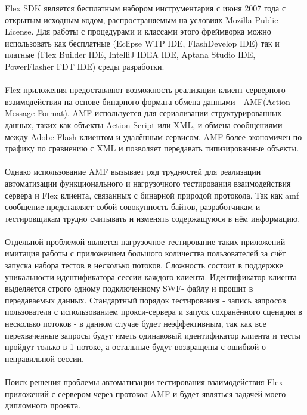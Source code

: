 Flex SDK  является бесплатным набором инструментария с июня 2007 
года с открытым исходным кодом,  распространяемым на условиях Mozilla Public License.  Для работы с процедурами и классами этого фреймворка можно использовать как бесплатные (Eclipse WTP IDE, FlashDevelop IDE) так и платные (Flex Builder IDE, IntelliJ IDEA IDE, Aptana Studio IDE, PowerFlasher FDT IDE) среды разработки.

\paragraph{ }

Flex приложения предоставляют возможность реализации клиент-серверного взаимодействия на основе бинарного формата обмена данными - AMF(Action Message Format). AMF используется для сериализации структурированных данных, таких как объекты Action Script или XML, и обмена сообщениями между Adobe Flash клиентом и удалённым сервисом. AMF более экономичен по трафику по сравнению с XML и позволяет передавать типизированные объекты.

\paragraph{ }

Однако использование AMF вызывает ряд трудностей для реализации автоматизации функционального и нагрузочного тестирования взаимодействия сервера и Flex клиента, связанных с бинарной природой протокола. Так как amf сообщение представляет собой совокупность байтов, разработчикам и тестировщикам трудно считывать и изменять содержащуюся в нём информацию.

\paragraph{ }

Отдельной проблемой является нагрузочное тестирование таких приложений - имитация работы с приложением большого количества пользователей за счёт запуска набора тестов в несколько потоков. Сложность состоит в поддержке уникальности идентификатора сессии каждого клиента. Идентификатор клиента выделяется строго одному подключенному SWF- файлу и прошит в передаваемых данных. Стандартный порядок тестирования - запись запросов пользователя с использованием прокси-сервера и запуск сохранённого сценария в несколько потоков - в данном случае будет неэффективным, так как  все перехваченные запросы будут иметь одинаковый идентификатор клиента и тесты пройдут только в 1 потоке, а остальные будут возвращены с ошибкой о неправильной сессии.
 
\paragraph{ }

Поиск решения проблемы автоматизации тестирования взаимодействия Flex приложений с сервером через протокол AMF и будет являться задачей моего дипломного проекта.

